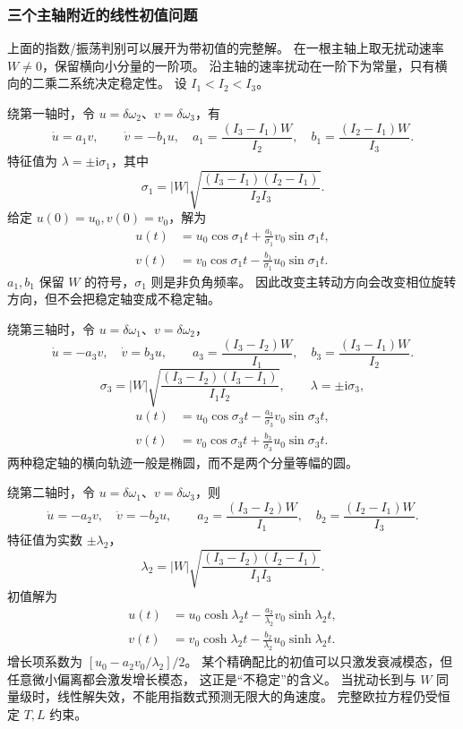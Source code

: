 \documentclass[UTF8,zihao=-4,fontset=fandol,a4paper]{ctexart}
\begin{document}
\subsubsection*{三个主轴附近的线性初值问题}
上面的指数/振荡判别可以展开为带初值的完整解。
在一根主轴上取无扰动速率 $W\ne0$，保留横向小分量的一阶项。
沿主轴的速率扰动在一阶下为常量，只有横向的二乘二系统决定稳定性。
设 $I_1<I_2<I_3$。

绕第一轴时，令 $u=\delta\omega_2$、$v=\delta\omega_3$，有
\[
\dot u=a_1v,\qquad \dot v=-b_1u,
\quad
 a_1=\frac{(I_3-I_1)W}{I_2},\quad
 b_1=\frac{(I_2-I_1)W}{I_3}.
\]
特征值为 $\lambda=\pm\mathrm i\sigma_1$，其中
\[
\sigma_1=|W|\sqrt{\frac{(I_3-I_1)(I_2-I_1)}{I_2I_3}}.
\]
给定 $u(0)=u_0,v(0)=v_0$，解为
\[
\begin{aligned}
u(t)&=u_0\cos\sigma_1t+\frac{a_1}{\sigma_1}v_0\sin\sigma_1t,\\
v(t)&=v_0\cos\sigma_1t-\frac{b_1}{\sigma_1}u_0\sin\sigma_1t.
\end{aligned}
\]
$a_1,b_1$ 保留 $W$ 的符号，$\sigma_1$ 则是非负角频率。
因此改变主转动方向会改变相位旋转方向，但不会把稳定轴变成不稳定轴。

绕第三轴时，令 $u=\delta\omega_1$、$v=\delta\omega_2$，
\[
\dot u=-a_3v,\quad\dot v=b_3u,\qquad
 a_3=\frac{(I_3-I_2)W}{I_1},\quad
 b_3=\frac{(I_3-I_1)W}{I_2}.
\]
\[
\sigma_3=|W|\sqrt{\frac{(I_3-I_2)(I_3-I_1)}{I_1I_2}},
\qquad\lambda=\pm\mathrm i\sigma_3,
\]
\[
\begin{aligned}
u(t)&=u_0\cos\sigma_3t-\frac{a_3}{\sigma_3}v_0\sin\sigma_3t,\\
v(t)&=v_0\cos\sigma_3t+\frac{b_3}{\sigma_3}u_0\sin\sigma_3t.
\end{aligned}
\]
两种稳定轴的横向轨迹一般是椭圆，而不是两个分量等幅的圆。

绕第二轴时，令 $u=\delta\omega_1$、$v=\delta\omega_3$，则
\[
\dot u=-a_2v,\quad\dot v=-b_2u,\qquad
 a_2=\frac{(I_3-I_2)W}{I_1},\quad
 b_2=\frac{(I_2-I_1)W}{I_3}.
\]
特征值为实数 $\pm\lambda_2$，
\[
\lambda_2=|W|\sqrt{\frac{(I_3-I_2)(I_2-I_1)}{I_1I_3}}.
\]
初值解为
\[
\begin{aligned}
u(t)&=u_0\cosh\lambda_2t-\frac{a_2}{\lambda_2}v_0\sinh\lambda_2t,\\
v(t)&=v_0\cosh\lambda_2t-\frac{b_2}{\lambda_2}u_0\sinh\lambda_2t.
\end{aligned}
\]
增长项系数为 $[u_0-a_2v_0/\lambda_2]/2$。
某个精确配比的初值可以只激发衰减模态，但任意微小偏离都会激发增长模态，
这正是“不稳定”的含义。
当扰动长到与 $W$ 同量级时，线性解失效，不能用指数式预测无限大的角速度。
完整欧拉方程仍受恒定 $T,L$ 约束。
\end{document}
